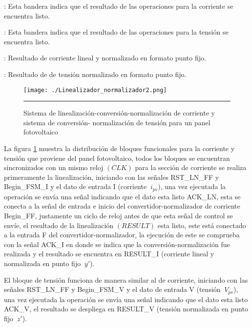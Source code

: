 \begin{compactitem}

\item {}: Esta bandera indica que el resultado de las operaciones para la corriente se encuentra listo.  
\item {}: Esta bandera indica que el resultado de las operaciones para la tensión se encuentra listo.  
\item {}: Resultado de corriente lineal y normalizado en formato punto fijo. 
\item {}: Resultado de de tensión normalizado en formato punto fijo.

\end{compactitem}

\begin{figure}[H]
  \centering
    \texttt{[image: ./Linealizador\_normalizador2.png]}
    \rule{35em}{0.5pt}
  \caption[Sistema de linealización-conversión-normalización de corriente y sistema de conversión- normalización de tensión para un panel fotovoltaico]{Sistema de linealización-conversión-normalización de corriente y sistema de conversión- normalización de tensión para un panel fotovoltaico}
  \label{fig:Sist2}
\end{figure}

La figura \ref{fig:Sist2} muestra la distribución de bloques funcionales para la corriente y tensión que proviene del panel fotovoltaico, todos los bloques se encuentran sincronizados con un mismo reloj $ \left(CLK\right)$ para la sección de corriente se realiza primeramente la linealización, iniciando con las señales RST\_LN\_FF y Begin\_FSM\_I y el dato de entrada I (corriente $\ i_{pv}$), una vez ejecutada la operación se envía una señal indicando que el dato esta listo ACK\_LN, esta se conecta a la señal de entrada e inicio del convertidor-normalizador de corriente Begin\_FF, justamente un ciclo de reloj antes de que esta señal de control se envíe, el resultado de la linealización $ \left(RESULT\right)$ esta listo, este está conectado a la entrada F del convertidor-normalizador, la ejecución de este se comprueba con la señal ACK\_I en donde se indica que la conversión-normalización fue realizada y el resultado se encuentra en RESULT\_I (corriente lineal y normalizada en punto fijo  $\ y' $).    

El bloque de tensión funciona de manera similar al de corriente, iniciando con las señales RST\_LN\_FF y Begin\_FSM\_V y el dato de entrada V (tensión $\ V_{pv}$), una vez ejecutada la operación se envía una señal indicando que el dato esta listo ACK\_V, el resultado se despliega en RESULT\_V (tensión normalizada en punto fijo  $\ z' $).

